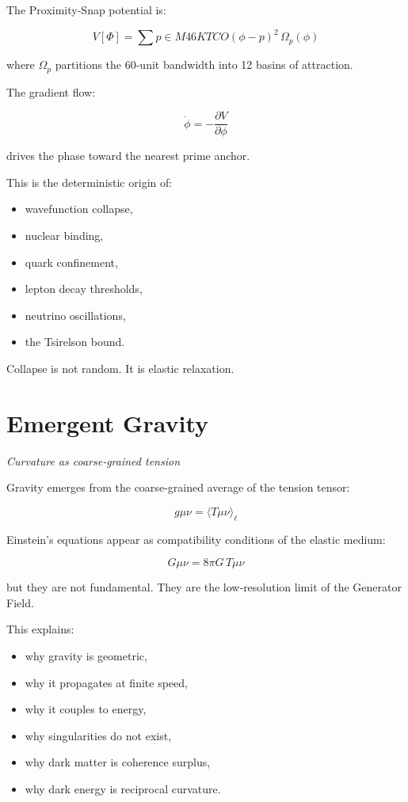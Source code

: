 \documentclass[reprint,amsmath,amssymb,aps,prl,floatfix]{revtex4-2}
\begin{document}
\begin{itemize}
The Proximity‑Snap potential is:

\[
V[\Phi] = \sum{p \in M46} K{TCO} (\phi - p)^2 \, \Omega_p(\phi)
\]

where \(\Omega_p\) partitions the 60‑unit bandwidth into 12 basins of attraction.

The gradient flow:

\[
\dot{\phi} = -\frac{\partial V}{\partial \phi}
\]

drives the phase toward the nearest prime anchor.

This is the deterministic origin of:
\begin{itemize}
\item wavefunction collapse,  
\item nuclear binding,  
\item quark confinement,  
\item lepton decay thresholds,  
\item neutrino oscillations,  
\item the Tsirelson bound.
\end{itemize}
\medskip

Collapse is not random.  
It is elastic relaxation.

\section{Emergent Gravity}
\textit{Curvature as coarse‑grained tension}

Gravity emerges from the coarse‑grained average of the tension tensor:

\[
g{\mu\nu} = \langle T{\mu\nu} \rangle_\ell
\]

Einstein’s equations appear as compatibility conditions of the elastic medium:

\[
G{\mu\nu} = 8\pi G \, T{\mu\nu}
\]

but they are not fundamental.  
They are the low‑resolution limit of the Generator Field.
\medskip

This explains:
\begin{itemize}
\item why gravity is geometric,  
\item why it propagates at finite speed,  
\item why it couples to energy,  
\item why singularities do not exist,  
\item why dark matter is coherence surplus,  
\item why dark energy is reciprocal curvature.
\end{itemize}
\medskip


\end{itemize}
\end{document}
